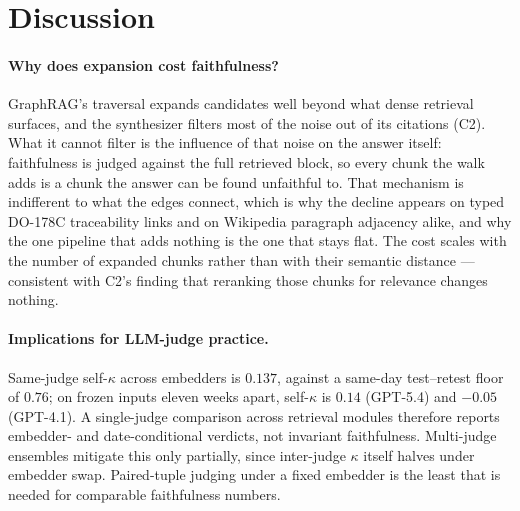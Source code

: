 \section{Discussion}
\label{sec:discussion}

\paragraph{Why does expansion cost faithfulness?}
GraphRAG's traversal expands candidates well beyond what dense
retrieval surfaces, and the synthesizer filters most of the noise out
of its citations (C2). What it cannot filter is the influence of that
noise on the answer itself: faithfulness is judged against the full
retrieved block, so every chunk the walk adds is a chunk the answer can
be found unfaithful to. That mechanism is indifferent to what the edges
connect, which is why the decline appears on typed DO-178C traceability
links and on Wikipedia paragraph adjacency alike, and why the one
pipeline that adds nothing is the one that stays flat. The cost scales
with the number of expanded chunks rather than with their semantic
distance --- consistent with C2's finding that reranking those chunks
for relevance changes nothing.

\paragraph{Implications for LLM-judge practice.}
Same-judge self-$\kappa$ across embedders is $0.137$, against a
same-day test--retest floor of $0.76$; on frozen inputs eleven weeks
apart, self-$\kappa$ is $0.14$ (GPT-5.4) and $-0.05$ (GPT-4.1). A single-judge comparison across
retrieval modules therefore reports embedder- and date-conditional
verdicts, not invariant faithfulness. Multi-judge ensembles mitigate
this only partially, since inter-judge $\kappa$ itself halves under
embedder swap. Paired-tuple judging under a fixed embedder is the
least that is needed for comparable faithfulness numbers.

